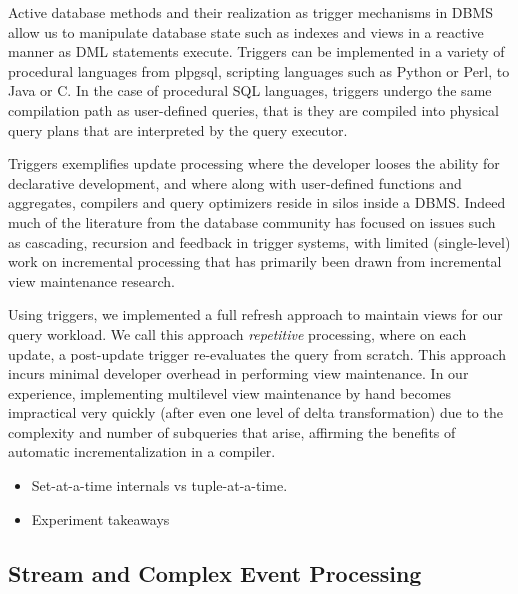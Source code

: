 Active database methods and their realization as trigger mechanisms in DBMS
allow us to manipulate database state such as indexes and views in a reactive
manner as DML statements execute. Triggers can be implemented in a variety of
procedural languages from plpgsql, scripting languages such as Python or Perl,
to Java or C. In the case of procedural SQL languages, triggers undergo the same
compilation path as user-defined queries, that is they are compiled into
physical query plans that are interpreted by the query executor.

Triggers exemplifies update processing where the developer looses the ability
for declarative development, and where along with user-defined functions and
aggregates, compilers and query optimizers reside in silos inside a DBMS. Indeed
much of the literature from the database community has focused on issues such as
cascading, recursion and feedback in trigger systems, with limited
(single-level) work on incremental processing that has primarily been drawn from
incremental view maintenance research.

Using triggers, we implemented a full refresh approach to maintain views for our
query workload. We call this approach \textit{repetitive} processing, where on
each update, a post-update trigger re-evaluates the query from scratch. This
approach incurs minimal developer overhead in performing view maintenance. In
our experience, implementing multilevel view maintenance by hand becomes
impractical very quickly (after even one level of delta transformation) due to
the complexity and number of subqueries that arise, affirming the benefits of
automatic incrementalization in a compiler. 

\begin{itemize}
  \item Set-at-a-time internals vs tuple-at-a-time.
  \item Experiment takeaways 
\end{itemize}


\subsection{Stream and Complex Event Processing}

